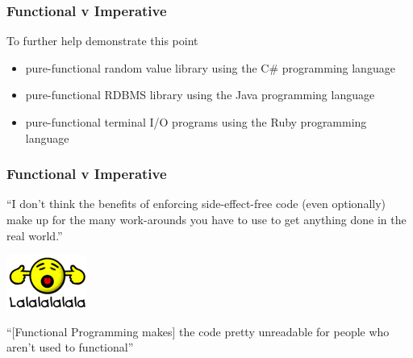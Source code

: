 \begin{frame}[fragile]
\frametitle{Functional v Imperative}
\begin{block}{To further help demonstrate this point}
\begin{itemize}
  \item<1> pure-functional random value library using the C\# programming language
  \item<2> pure-functional RDBMS library using the Java programming language
  \item<3> pure-functional terminal I/O programs using the Ruby programming language
\end{itemize}
\end{block}
\end{frame}


\begin{frame}[fragile]
\frametitle{Functional v Imperative}
``I don't think the benefits of enforcing side-effect-free code (even optionally) make up for the many work-arounds you have to use to get anything done in the real world.''
\begin{center}
\includegraphics[width=0.1\paperwidth]{image/lalala.png}
\end{center}
``[Functional Programming makes] the code pretty unreadable for people who aren't used to functional''
\end{frame}

% 
